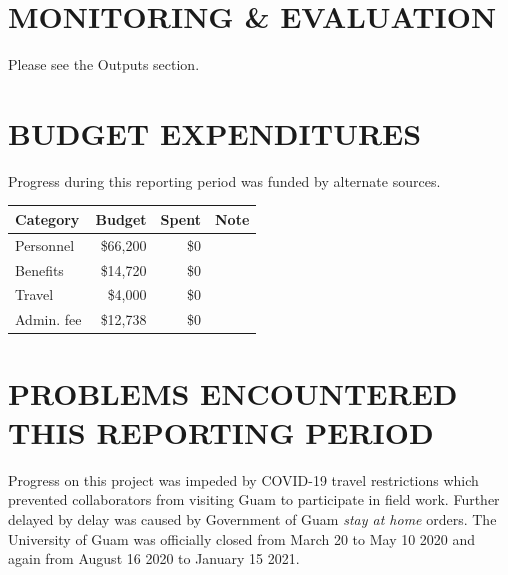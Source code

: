 \documentclass[12pt,letterpaper,english,bibliography=totocnumbered,abstract=on]{scrartcl}
\begin{document}
\clearpage
\section{MONITORING \& EVALUATION}

%

Please see the Outputs section.

\section{BUDGET EXPENDITURES}


Progress during this reporting period was funded by alternate sources.

\medskip
\begin{tabular}{lrrl}
	\hline
	Category & Budget & Spent & Note \\
	\hline 
	Personnel & \$66,200 & \$0 & \\ 
	Benefits & \$14,720 & \$0 & \\ 
	Travel & \$4,000 & \$0 & \\
	Admin. fee & \$12,738 & \$0 & \\ 
	\hline 
\end{tabular} 



\section{PROBLEMS ENCOUNTERED THIS REPORTING PERIOD}


Progress on this project was impeded by COVID-19 travel restrictions which prevented collaborators from visiting Guam to participate in field work. Further delayed by delay was caused by Government of Guam \textit{stay at home} orders. The University of Guam was officially closed from March 20 to May 10 2020 and again from August 16 2020 to January 15 2021.
\end{document}

